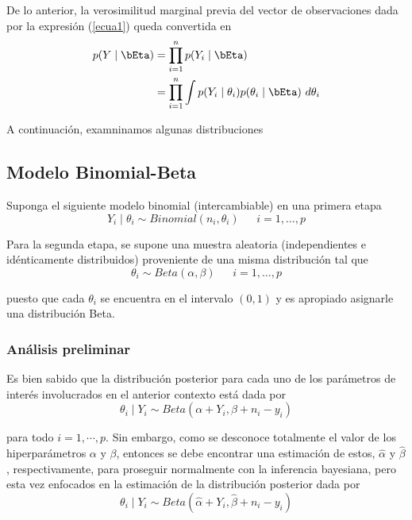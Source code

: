 De lo anterior, la verosimilitud marginal previa del vector de observaciones dada por la expresión (\ref{ecua1}) queda convertida en
\begin{align}
p(Y \mid \bEta)&=\prod_{i=1}^np(Y_i \mid \bEta) \notag \\
&=\prod_{i=1}^n\int p(Y_i \mid \theta_i)p(\theta_i \mid \bEta) \ d\theta_i
\end{align}

A continuación, examninamos algunas distribuciones 

\subsection{Modelo Binomial-Beta}\label{Binomial-Beta}
Suponga el siguiente modelo binomial (intercambiable) en una primera etapa
\begin{equation*}
Y_i \mid \theta_i \sim Binomial(n_i,\theta_i)  \ \ \ \ \ \ \ i=1,\ldots,p
\end{equation*}

Para la segunda etapa, se supone una muestra aleatoria (independientes e idénticamente distribuidos) proveniente de una misma distribución tal que
\begin{equation*}
\theta_i \sim Beta(\alpha, \beta)  \ \ \ \ \ \ \ i=1,\ldots,p
\end{equation*}

puesto que cada $\theta_i$ se encuentra en el intervalo $(0,1)$ y es apropiado asignarle una distribución Beta.
\subsubsection{Análisis preliminar}

Es bien sabido que la distribución posterior para cada uno de los parámetros de interés involucrados en el anterior contexto está dada por
\begin{equation*}
\theta_i \mid Y_i \sim Beta(\alpha+Y_i, \beta+n_i-y_i)
\end{equation*}

para todo $i=1,\cdots,p$. Sin embargo, como se desconoce totalmente el valor de los hiperparámetros $\alpha$ y $\beta$, entonces se debe encontrar una estimación de estos, $\hat{\alpha}$ y $\hat{\beta}$, respectivamente, para proseguir normalmente con la inferencia bayesiana, pero esta vez enfocados en la estimación de la distribución posterior dada por
\begin{equation*}
\theta_i \mid Y_i \sim Beta(\hat{\alpha}+Y_i, \hat{\beta}+n_i-y_i)
\end{equation*}

